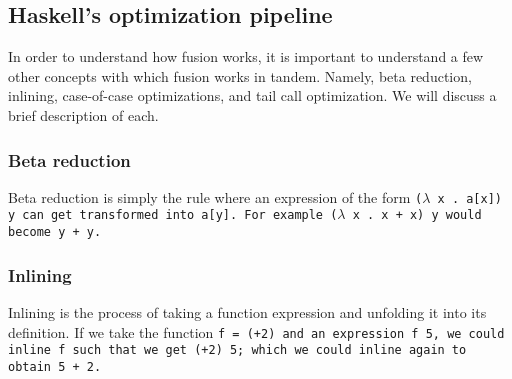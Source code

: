 \subsection{Haskell's optimization pipeline}
In order to understand how fusion works, it is important to understand a few other concepts with which fusion works in tandem.
Namely, beta reduction, inlining, case-of-case optimizations, and tail call optimization.
We will discuss a brief description of each.

\subsubsection{Beta reduction}
Beta reduction is simply the rule where an expression of the form \tt{($\lambda$ x . a[x]) y} can get transformed into \tt{a[y]}.
For example \tt{($\lambda$ x . x + x) y} would become \tt{y + y}.
\subsubsection{Inlining}
Inlining is the process of taking a function expression and unfolding it into its definition.
If we take the function \tt{f = (+2)} and an expression \tt{f 5}, we could inline \tt{f} such that we get \tt{(+2) 5}; which we could inline again to obtain \tt{5 + 2}.
